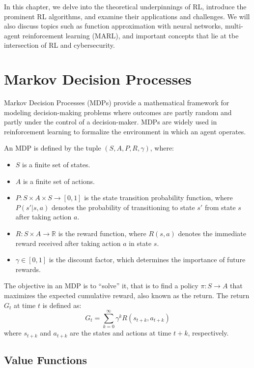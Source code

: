 In this chapter, we delve into the theoretical underpinnings of \gls{RL}, introduce the prominent \gls{RL} algorithms, and examine their applications and challenges.
We will also discuss topics such as function approximation with neural networks, multi-agent reinforcement learning (\gls{MARL}), and important concepts that lie at tbe intersection of \gls{RL} and cybersecurity.

\section{Markov Decision Processes}
\label{sec:mdp}

Markov Decision Processes (MDPs) provide a mathematical framework for modeling decision-making problems where outcomes are partly random and partly under the control of a decision-maker.
MDPs are widely used in reinforcement learning to formalize the environment in which an agent operates.

An MDP is defined by the tuple $(S, A, P, R, \gamma)$, where:
\begin{itemize}
    \item $S$ is a finite set of states.
    \item $A$ is a finite set of actions.
    \item $P: S \times A \times S \rightarrow [0,1]$ is the state transition probability function, where $P(s'|s,a)$ denotes the probability of transitioning to state $s'$ from state $s$ after taking action $a$.
    \item $R: S \times A \rightarrow \mathbb{R}$ is the reward function, where $R(s,a)$ denotes the immediate reward received after taking action $a$ in state $s$.
    \item $\gamma \in [0,1]$ is the discount factor, which determines the importance of future rewards.
\end{itemize}

The objective in an MDP is to ``solve'' it, that is to find a policy $\pi: S \rightarrow A$ that maximizes the expected cumulative reward, also known as the return.
The return $G_t$ at time $t$ is defined as:
\[
G_t = \sum_{k=0}^{\infty} \gamma^k R(s_{t+k}, a_{t+k})
\]
where $s_{t+k}$ and $a_{t+k}$ are the states and actions at time $t+k$, respectively.

\subsection{Value Functions}

